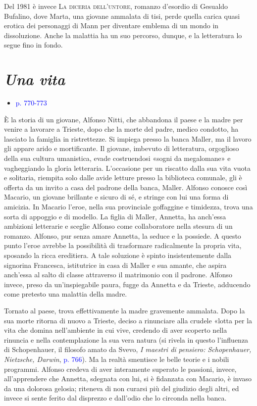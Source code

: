 \documentclass[a4paper, twoside, titlepage]{book}
\newcounter{mar}
\newcommand{\titolo}[1]{\textsc{#1}} %
\newcommand{\elenco}[1]{%
\begin{itemize}
#1
\end{itemize}}
\renewcommand{\emph}[1]{\textcolor{blue}{#1}}
\begin{document}
Del 1981 è invece \titolo{La diceria dell’untore}, romanzo d’esordio di Gesualdo Bufalino, dove Marta, una giovane ammalata di tisi, perde quella carica quasi erotica dei personaggi di Mann per diventare emblema di un mondo in dissoluzione. Anche la malattia ha un suo percorso, dunque, e la letteratura lo segue fino in fondo.


\chapter{\textit{Una vita}}
\elenco{\item \emph{p. 770-773}}

È la storia di un giovane, Alfonso Nitti, che abbandona il paese e la madre per venire a lavorare a Trieste, dopo che la morte del padre, medico condotto, ha lasciato la famiglia in ristrettezze. Si impiega presso la banca Maller, ma il lavoro gli appare arido e mortificante. Il giovane, imbevuto di letteratura, orgoglioso della sua cultura umanistica, evade costruendosi «sogni da megalomane» e vagheggiando la gloria letteraria.
L'occasione per un riscatto dalla sua vita vuota e solitaria, riempita solo dalle avide letture presso la biblioteca comunale, gli è offerta da un invito a casa del padrone della banca, Maller. Alfonso conosce così Macario, un giovane brillante e sicuro di sé, e stringe con lui una forma di amicizia. In Macario l'eroe, nella sua provinciale goffaggine e timidezza, trova una sorta di appoggio e di modello. La figlia di Maller, Annetta, ha anch'essa ambizioni letterarie e sceglie Alfonso come collaboratore nella stesura di un romanzo. Alfonso, pur senza amare Annetta, la seduce e la possiede. A questo punto l'eroe avrebbe la possibilità di trasformare radicalmente la propria vita, sposando la ricca ereditiera. A tale soluzione è spinto insistentemente dalla signorina Francesca, istitutrice in casa di Maller e sua amante, che aspira anch'essa al salto di classe attraverso il matrimonio con il padrone. Alfonso invece, preso da un'inspiegabile paura, fugge da Annetta e da Trieste, adducendo come pretesto una malattia della madre.

Tornato al paese, trova effettivamente la madre gravemente ammalata. Dopo la sua morte ritorna di nuovo a Trieste, deciso a rinunciare alla crudele «lotta per la vita che domina nell'ambiente in cui vive, credendo di aver scoperto nella rinuncia e nella contemplazione la sua vera natura (si rivela in questo l'influenza di Schopenhauer, il filosofo amato da Svevo, \textit{I maestri di pensiero: Schopenhauer, Nietzsche, Darwin}, \emph{p. 766}). Ma la realtà smentisce le belle teorie e i nobili programmi. Alfonso credeva di aver interamente superato le passioni, invece, all'apprendere che Annetta, sdegnata con lui, si è fidanzata con Macario, è invaso da una dolorosa gelosia; riteneva di non curarsi più del giudizio degli altri, ed invece si sente ferito dal disprezzo e dall'odio che lo circonda nella banca.
\end{document}
